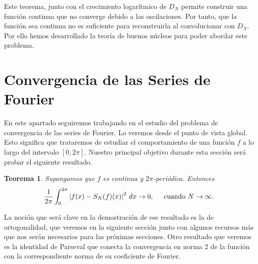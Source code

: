 \documentclass[12pt]{article}
\theoremstyle{plain}
\newtheorem*{teorema*}{Teorema}
\theoremstyle{definition}
\numberwithin{equation}{section}
\begin{document}
        Este teorema, junto con el crecimiento logarítmico de \(D_N\) permite construir una función continua que no converge debido a las oscilaciones. Por tanto, que la función sea continua no es suficiente para reconstruirla al convolucionar con \(D_N\). Por ello hemos desarrollado la teoría de buenos núcleos para poder abordar este problema.
\newpage
\section{Convergencia de las Series de Fourier}
    En este apartado seguiremos trabajando en el estudio del problema de convergencia de las series de Fourier. Lo veremos desde el punto de vista global. Esto significa que trataremos de estudiar el comportamiento de una función \(f\) a lo largo del intervalo \([0,2\pi]\).
    Nuestro principal objetivo durante esta sección será probar el siguiente resultado.
        \begin{teorema*}
            Supongamos que \(f\) es continua y \(2\pi\)-periódica. Entonces
            \begin{equation*}
                \frac{1}{2\pi} \int_{0}^{2\pi} \left\lvert f(x) - S_N (f)(x)\right\rvert^2  \,dx \to 0, \hspace{5mm} \text{cuando \(N \to \infty\)}.
            \end{equation*}
        \end{teorema*}
        La noción que será clave en la demostración de ese resultado es la de ortogonalidad, que veremos en la siguiente sección junto con algunos recursos más que nos serán necesarios para las próximas secciones.
        Otro resultado que veremos es la identidad de Parseval que conecta la convergencia en norma 2 de la función con la correspondiente norma de su coeficiente de Fourier.
\end{document}
